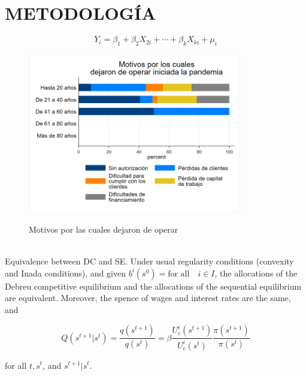 \documentclass[12pt,a4paper]{article} %
\begin{document}
\newpage
\section{\hspace{1mm} METODOLOGÍA}
		\lipsum[1]
			\begin{equation}
				Y_{i} = \beta_{1} + \beta_{2}X_{2i} + \cdots + \beta_{k}X_{ki} + \mu_{i}
			\end{equation}
		\lipsum[1]
			\begin{figure}[h]
				\centering
				\caption{Motivos por las cuales dejaron de operar}
				\includegraphics[height=7cm]{EXAMEN_FINAL/Imagenes/Graph2.png}
				\label{fig: Motivos por las cuales dejaron de operar}
			\end{figure}
		\lipsum[1]
		\vspace{0.7cm}\\
		\textcolor{red!75}{Equivalence between DC and SE}. Under usual
		regularity conditions (convexity and Inada conditions), and given
		$b^{i}(s^{0}) = \text{for all} \quad i \in I$, the allocations of the Debreu
		competitive equilibrium and the allocations of the sequential equilibrium
		are equivalent. Moreover, the spence of wages and interest rates are the same, and

		\begin{equation}
				Q(s^{t+1}|s^{t}) = \frac{q(s^{t+1})}{q(s^{t})} =
				\beta \frac{U_{c}^{i}(s^{t+1})}{U_{c}^{i}(s^{t})} \frac{\pi(s^{t+1})}{\pi(s^{t})}
		\end{equation}

		for all $ t, s^{t}$, and $s^{t+1}|s^{t}$.

\end{document}
